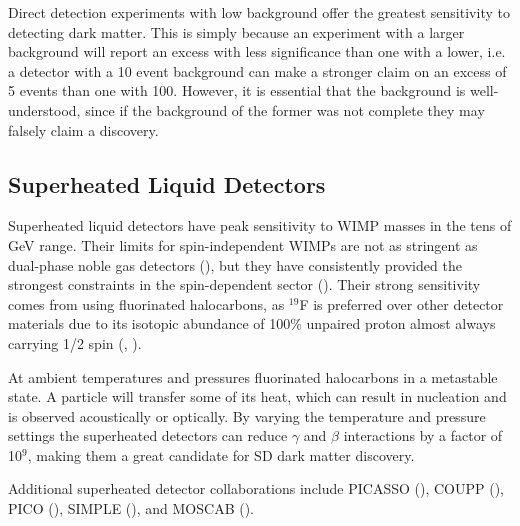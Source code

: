 Direct detection experiments with low background offer the greatest sensitivity to detecting dark matter.  This is simply because
an experiment with a larger background will report an excess with less significance than one with a lower, i.e. a detector with a 10 event
background can make a stronger claim on an excess of 5 events than one with 100.  However, it is essential that the background is
well-understood, since if the background of the former was not complete they may falsely claim a discovery.
 
  
 
\subsection{Superheated Liquid Detectors}
\label{subsec:bubbles}
Superheated liquid detectors have peak sensitivity to WIMP masses in the tens of GeV range.  Their limits for spin-independent
WIMPs are not as stringent as dual-phase noble gas detectors (), but they have consistently provided the
strongest constraints in the spin-dependent sector ().  Their strong sensitivity comes from using fluorinated
halocarbons, as $^{19}$F is preferred over other detector materials due to its isotopic abundance of 100\% unpaired proton
almost always carrying 1/2 spin (, ).

At ambient temperatures and pressures fluorinated halocarbons in a metastable state.  A particle will transfer some of its heat,
which can result in nucleation and is observed acoustically or optically.  By varying the temperature and pressure settings
the superheated detectors can reduce $\gamma$ and $\beta$ interactions by a factor of 10$^{9}$, making them a great candidate for
SD dark matter discovery.

Additional superheated detector collaborations include PICASSO (), COUPP (),
PICO (), SIMPLE (), and MOSCAB ().



